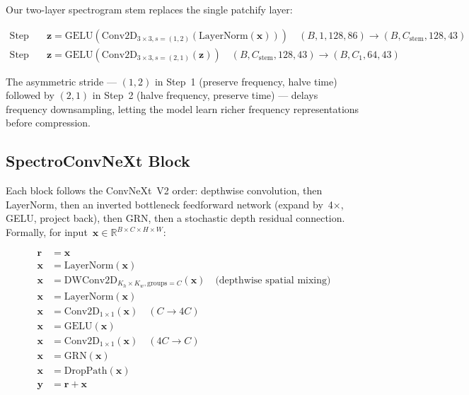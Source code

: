 \documentclass{article}
\begin{document}
Our two-layer spectrogram stem replaces the single patchify layer:

\begin{align}
  \text{Step 1:}&\quad \mathbf{z} = \text{GELU}(\text{Conv2D}_{3\times3, s=(1,2)}(\text{LayerNorm}(\mathbf{x}))) \quad
  (B, 1, 128, 86) \rightarrow (B, C_{\text{stem}}, 128, 43) \label{eq:stem1}\\
  \text{Step 2:}&\quad \mathbf{z} = \text{GELU}(\text{Conv2D}_{3\times3, s=(2,1)}( \mathbf{z})) \quad
  (B, C_{\text{stem}}, 128, 43) \rightarrow (B, C_1, 64, 43) \label{eq:stem2}
\end{align}

The asymmetric stride --- $(1,2)$ in Step~1 (preserve frequency, halve time)
followed by $(2,1)$ in Step~2 (halve frequency, preserve time) --- delays
frequency downsampling, letting the model learn richer frequency representations
before compression.

\subsection{SpectroConvNeXt Block}

Each block follows the ConvNeXt~V2 order: depthwise convolution, then LayerNorm,
then an inverted bottleneck feedforward network (expand by~4$\times$, GELU,
project back), then GRN, then a stochastic depth residual connection. Formally,
for input~$\mathbf{x} \in \mathbb{R}^{B \times C \times H \times W}$:

\begin{align}
  \mathbf{r} &= \mathbf{x} \label{eq:residual}\\
  \mathbf{x} &= \text{LayerNorm}(\mathbf{x}) \label{eq:norm1}\\
  \mathbf{x} &= \text{DWConv2D}_{K_h\times K_w, \text{groups}=C}(\mathbf{x}) \quad
  \text{(depthwise spatial mixing)} \label{eq:dwconv}\\
  \mathbf{x} &= \text{LayerNorm}(\mathbf{x}) \label{eq:norm2}\\
  \mathbf{x} &= \text{Conv2D}_{1\times1}(\mathbf{x}) \quad (C \rightarrow 4C) \label{eq:expand}\\
  \mathbf{x} &= \text{GELU}(\mathbf{x}) \label{eq:gelu}\\
  \mathbf{x} &= \text{Conv2D}_{1\times1}(\mathbf{x}) \quad (4C \rightarrow C) \label{eq:project}\\
  \mathbf{x} &= \text{GRN}(\mathbf{x}) \label{eq:grn}\\
  \mathbf{x} &= \text{DropPath}(\mathbf{x}) \label{eq:droppath}\\
  \mathbf{y} &= \mathbf{r} + \mathbf{x} \label{eq:output}
\end{align}
\end{document}
